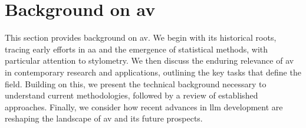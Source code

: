 \chapter{Background on \ac{av}}
\label{chap:authorship_identification}

This section provides background on \ac{av}. 
We begin with its historical roots, tracing early efforts in \ac{aa} and the emergence of statistical methods, with particular attention to stylometry. 
We then discuss the enduring relevance of \ac{av} in contemporary research and applications, outlining the key tasks that define the field. 
Building on this, we present the technical background necessary to understand current methodologies, followed by a review of established approaches. 
Finally, we consider how recent advances in \ac{llm} development are reshaping the landscape of \ac{av} and its future prospects.










% 



